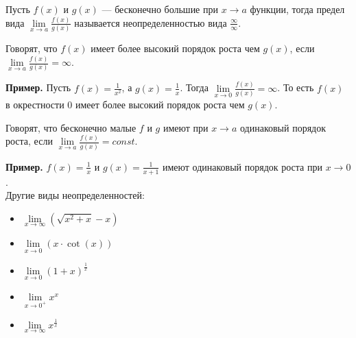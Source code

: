 \documentclass{article}
\begin{document}
\begin{definition}
    Пусть \(f(x)\) и \(g(x)\) --- бесконечно большие при \(x \to a\) функции, тогда предел вида \(\displaystyle \lim\limits_{x \to a}\frac{f(x)}{g(x)}\) называется неопределенностью вида \(\displaystyle \frac{\infty}{\infty}\).   
\end{definition}

\begin{definition}
    Говорят, что \(f(x)\) имеет более высокий порядок роста чем \(g(x)\), если \(\displaystyle \lim\limits_{x \to a}\frac{f(x)}{g(x)} = \infty\).   
\end{definition}
\noindent
\textbf{Пример.} Пусть \(\displaystyle f(x) = \frac{1}{x^2}\), а \(\displaystyle g(x) = \frac{1}{x}\). Тогда \(\displaystyle \lim\limits_{x \to 0}\frac{f(x)}{g(x)} = \infty\). То есть \(f(x)\) в окрестности 0 имеет более высокий порядок роста чем \(g(x)\).

\begin{definition}
    Говорят, что бесконечно малые \(f\) и \(g\) имеют при \(x \to a\) одинаковый порядок роста, если \(\displaystyle \lim\limits_{x \to a}\frac{f(x)}{g(x)} = const\).    
\end{definition}
\noindent
\textbf{Пример.} \(\displaystyle f(x) = \frac{1}{x}\) и \(\displaystyle g(x) = \frac{1}{x + 1}\) имеют одинаковый порядок роста при \(x \to 0\).\\

\noindent
Другие виды неопределенностей:
\begin{itemize}
    \item{\makebox[1.5cm]{\(\infty - \infty\):\hfill} \(\displaystyle \lim\limits_{x \to \infty}(\sqrt{x^2 + x} - x)\)} 
    \item{\makebox[1.5cm]{\(0 \cdot \infty\):\hfill} \(\displaystyle \lim\limits_{x \to 0}(x \cdot \cot(x))\)}  
    \item{ \(\displaystyle \lim\limits_{x \to 0}(1 + x)^{\frac{1}{x}}\)} 
    \item{ \(\displaystyle \lim\limits_{x \to 0^{+}}x^{x}\)}
    \item{ \(\displaystyle \lim\limits_{x \to \infty} x^{\frac{1}{x}}\)}
\end{itemize}
\end{document}
